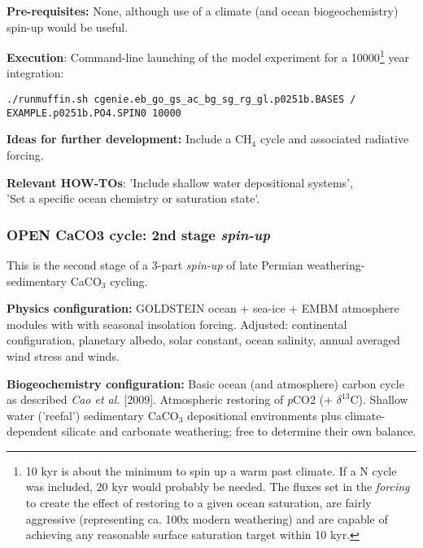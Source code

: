 \documentclass[10pt,twoside]{article}
\begin{document}
\noindent \textbf{Pre-requisites:} None, although use of a climate (and ocean biogeochemistry) spin-up would be useful.

\noindent \textbf{Execution}: Command-line launching of the model experiment for a 10000\footnote{10 kyr is about the minimum to spin up a warm past climate. If a N cycle was included, 20 kyr would probably be needed. The fluxes set in the \textsl{forcing} to create the effect of restoring to a given ocean saturation, are fairly aggressive (representing ca. 100x modern weathering) and are capable of achieving any reasonable surface saturation target within 10 kyr.} year integration:
\vspace{-10pt}\small\begin{verbatim}./runmuffin.sh cgenie.eb_go_gs_ac_bg_sg_rg_gl.p0251b.BASES / EXAMPLE.p0251b.PO4.SPIN0 10000\end{verbatim}\normalsize\vspace{-10pt}

\noindent \textbf{Ideas for further development:} Include a CH$_{4}$ cycle and associated radiative forcing.

\noindent \textbf{Relevant HOW-TOs}: 'Include shallow water depositional systems',
\\'Set a specific ocean chemistry or saturation state'.


\subsubsection{OPEN CaCO3 cycle: 2nd stage \textit{spin-up}}\label{EXAMPLE.p0251b.PO4.SPIN1}

This is the second stage of a 3-part \textsl{spin-up} of late Permian weathering-sedimentary CaCO$_{3}$ cycling.

\noindent \textbf{Physics configuration:} GOLDSTEIN ocean + sea-ice + EMBM atmosphere modules with with seasonal insolation forcing. Adjusted: continental configuration, planetary albedo, solar constant, ocean salinity, annual averaged wind stress and winds.

\noindent \textbf{Biogeochemistry configuration:} Basic ocean (and atmosphere) carbon cycle as described \textit{Cao et al.} [2009]. Atmospheric restoring of \textit{p}CO2 (+ $\delta^{13}$C). Shallow water ('reefal') sedimentary CaCO$_{3}$ depositional environments plus climate-dependent silicate and carbonate weathering; free to determine their own balance.
\end{document}
